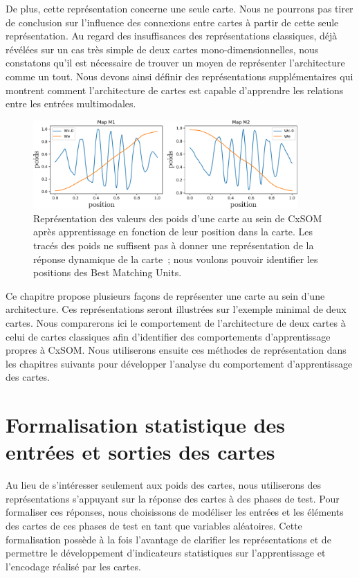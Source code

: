 \documentclass[../main]{subfiles}
\begin{document}
De plus, cette représentation concerne une seule carte. Nous ne pourrons pas tirer de conclusion sur l'influence des connexions entre cartes à partir de cette seule représentation.
Au regard des insuffisances des représentations classiques, déjà révélées sur un cas très simple de deux cartes mono-dimensionnelles, nous constatons qu'il est nécessaire de trouver un moyen de représenter l'architecture comme un tout. 
Nous devons ainsi définir des représentations supplémentaires qui montrent comment l'architecture de cartes est capable d'apprendre les relations entre les entrées multimodales.

\begin{figure}
\centering
\includegraphics[width=0.9\textwidth]{weights_cercle1.pdf}
\caption{Représentation des valeurs des poids d'une carte au sein de CxSOM après apprentissage en fonction de leur position dans la carte. Les tracés des poids ne suffisent pas à donner une représentation de la réponse dynamique de la carte~; nous voulons pouvoir identifier les positions des Best Matching Units. \label{fig:weights}}
\end{figure}

Ce chapitre propose plusieurs façons de représenter une carte au sein d'une architecture.
Ces représentations seront illustrées sur l'exemple minimal de deux cartes.
Nous comparerons ici le comportement de l'architecture de deux cartes à celui de cartes classiques afin d'identifier des comportements d'apprentissage propres à CxSOM.
Nous utiliserons ensuite ces méthodes de représentation dans les chapitres suivants pour développer l'analyse du comportement d'apprentissage des cartes.

\section{Formalisation statistique des entrées et sorties des cartes}

Au lieu de s'intéresser seulement aux poids des cartes, nous utiliserons des représentations s'appuyant sur la réponse des cartes à des phases de test.
Pour formaliser ces réponses, nous choisissons de modéliser les entrées et les éléments des cartes de ces phases de test en tant que variables aléatoires.
Cette formalisation possède à la fois l'avantage de clarifier les représentations et de permettre le développement d'indicateurs statistiques sur l'apprentissage et l'encodage réalisé par les cartes.
\end{document}
